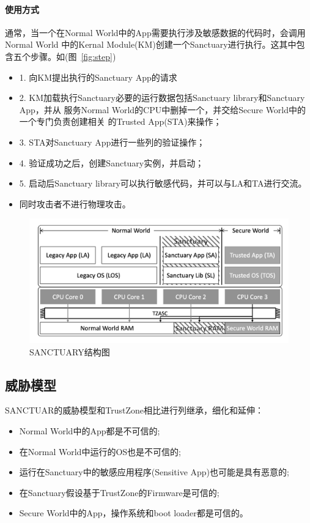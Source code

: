 \paragraph{使用方式}
通常，当一个在Normal World中的App需要执行涉及敏感数据的代码时，会调用Normal World
中的Kernal Module(KM)创建一个Sanctuary进行执行。这其中包含五个步骤。如(图~\ref{fig:step})
\begin{itemize}
    \item
    1. 向KM提出执行的Sanctuary App的请求
    \item
    2. KM加载执行Sanctuary必要的运行数据包括Sanctuary library和Sanctuary App，并从
    服务Normal World的CPU中删掉一个，并交给Secure World中的一个专门负责创建相关
    的Trusted App(STA)来操作；
    \item 
    3. STA对Sanctuary App进行一些列的验证操作；
    \item
    4. 验证成功之后，创建Sanctuary实例，并启动；
    \item
    5. 启动后Sanctuary library可以执行敏感代码，并可以与LA和TA进行交流。
    \item
    同时攻击者不进行物理攻击。
\end{itemize}

\begin{figure}
    \centering
    \includegraphics[scale=0.45]{Figures/trustzone/sancutary.png}
    \decoRule
    \caption{SANCTUARY结构图}
    \label{fig:sanctuary}
\end{figure}

\subsection{威胁模型}
SANCTUAR的威胁模型和TrustZone相比进行列继承，细化和延伸：
\begin{itemize}
    \item
    Normal World中的App都是不可信的;
    \item
    在Normal World中运行的OS也是不可信的;
    \item 
    运行在Sanctuary中的敏感应用程序(Sensitive App)也可能是具有恶意的;
    \item
    在Sanctuary假设基于TrustZone的Firmware是可信的;
    \item
    Secure World中的App，操作系统和boot loader都是可信的。
\end{itemize}

